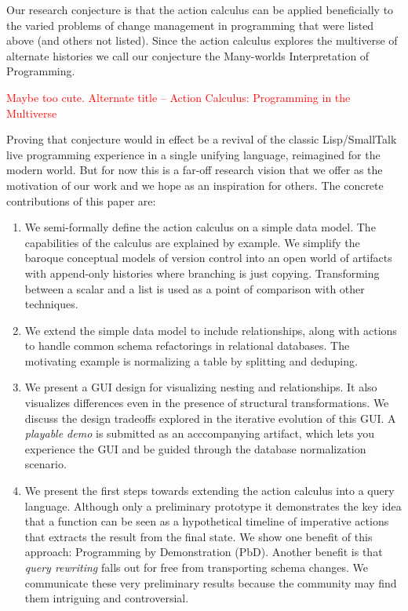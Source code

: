 \documentclass[english,submission]{programming}
\theoremstyle{definition}
\begin{document}
Our research conjecture is that the action calculus can be applied beneficially to the varied problems of change management in programming that were listed above (and others not listed). Since the action calculus explores the multiverse of alternate histories we call our conjecture the Many-worlds Interpretation of Programming.

\textcolor{red}{Maybe too cute. Alternate title --
Action Calculus: Programming in the Multiverse\\
}

Proving that conjecture would in effect be a revival of the classic Lisp/SmallTalk live programming experience in a single unifying language, reimagined for the modern world. But for now this is a far-off research vision that we offer
as the motivation of our work and we hope as an inspiration for others. The concrete contributions of this paper are:

\begin{enumerate}

  \item We semi-formally define the action calculus on a simple data model. The capabilities of the calculus are explained by example. We simplify the baroque conceptual models of version control into an open world of artifacts with append-only histories where branching is just copying. Transforming between a scalar and a list is used as a point of comparison with other techniques.

  \item We extend the simple data model to include relationships, along with actions to handle common schema refactorings in relational databases. The motivating example is normalizing a table by splitting and deduping.

  \item We present a GUI design for visualizing nesting and relationships. It also visualizes differences even in the presence of structural transformations. We discuss the design tradeoffs explored in the iterative evolution of this GUI. A \textit{playable demo} is submitted as an acccompanying artifact, which lets you experience the GUI and be guided through the database normalization scenario.

  \item We present the first steps towards extending the action calculus into a query language. Although only a preliminary prototype it demonstrates the key idea that a function can be seen as a hypothetical timeline of imperative actions that extracts the result from the final state. We show one benefit of this approach: Programming by Demonstration (PbD). Another benefit is that \textit{query rewriting} falls out for free from transporting schema changes. We communicate these very preliminary results because the community may find them intriguing and controversial.

\end{enumerate}
\end{document}
